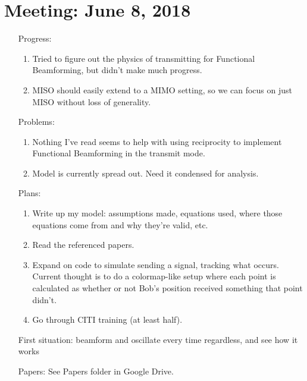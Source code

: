\documentclass[11pt]{article}
\begin{document}
\section{Meeting: June 8, 2018}
\begin{itemize}
\item[Progress:]
\begin{enumerate}
\item Tried to figure out the physics of transmitting for Functional Beamforming, but didn't make much progress.
\item MISO should easily extend to a MIMO setting, so we can focus on just MISO without loss of generality.
\end{enumerate}

\item[Problems:]
\begin{enumerate}
\item Nothing I've read seems to help with using reciprocity to implement Functional Beamforming in the transmit mode.
\item Model is currently spread out.  Need it condensed for analysis.
\end{enumerate}

\item[Plans:]
\begin{enumerate}
\item Write up my model: assumptions made, equations used, where those equations come from and why they're valid, etc.
\item Read the referenced papers.
\item Expand on code to simulate sending a signal, tracking what occurs.  Current thought is to do a colormap-like setup where each point is calculated as whether or not Bob's position received something that point didn't.
\item Go through CITI training (at least half).
\end{enumerate}
First situation: beamform and oscillate every time regardless, and see how it works

\item[Papers:]
See Papers folder in Google Drive.

\end{itemize}\newpage
\end{document}
